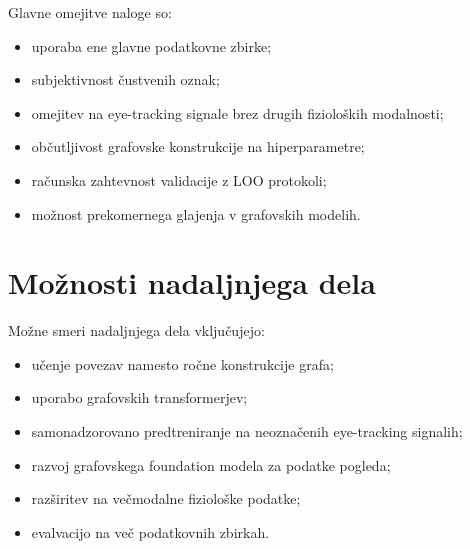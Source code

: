 Glavne omejitve naloge so:
\begin{itemize}
    \item uporaba ene glavne podatkovne zbirke;
    \item subjektivnost čustvenih oznak;
    \item omejitev na eye-tracking signale brez drugih fizioloških modalnosti;
    \item občutljivost grafovske konstrukcije na hiperparametre;
    \item računska zahtevnost validacije z LOO protokoli;
    \item možnost prekomernega glajenja v grafovskih modelih.
\end{itemize}

\section{Možnosti nadaljnjega dela}
\label{subsec:future-work}

Možne smeri nadaljnjega dela vključujejo:
\begin{itemize}
    \item učenje povezav namesto ročne konstrukcije grafa;
    \item uporabo grafovskih transformerjev;
    \item samonadzorovano predtreniranje na neoznačenih eye-tracking signalih;
    \item razvoj grafovskega foundation modela za podatke pogleda;
    \item razširitev na večmodalne fiziološke podatke;
    \item evalvacijo na več podatkovnih zbirkah.
\end{itemize}
